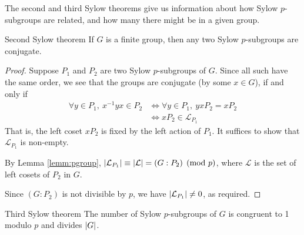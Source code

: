 The second and third Sylow theorems give us information about how Sylow $p$-subgroups are related, and how many there might be in a given group.

\begin{thm}{Second Sylow theorem}{}
	If $G$ is a finite group, then any two Sylow $p$-subgroups are conjugate.
\end{thm}

\begin{proof}
	Suppose $P_1$ and $P_2$ are two Sylow $p$-subgroups of $G$. Since all such have the same order, we see that the groups are conjugate (by some $x\in G$), if and only if
	\begin{align*}
		\forall y\in P_1,\ x^{-1}yx\in P_2 &\iff \forall y\in P_1,\ yxP_2=xP_2\\
		&\iff xP_2\in\mathcal L_{P_1}
	\end{align*}
	That is, the left coset $xP_2$ is fixed by the left action of $P_1$. It suffices to show that $\mathcal L_{P_1}$ is non-empty.\par
	By Lemma \ref{lemm:pgroup}, $\left| \mathcal L_{P_1}\right|\equiv\left| \mathcal L\right|=(G:P_2)\pmod p$, where $\mathcal L$ is the set of left cosets of $P_2$ in $G$.\par
	Since $(G:P_2)$ is not divisible by $p$, we have $\left| \mathcal L_{P_1}\right|\neq 0$, as required.
\end{proof}

\begin{thm}{Third Sylow theorem}{}
	The number of Sylow $p$-subgroups of $G$ is congruent to 1 modulo $p$ and divides $\left| G\right|$.
\end{thm}

